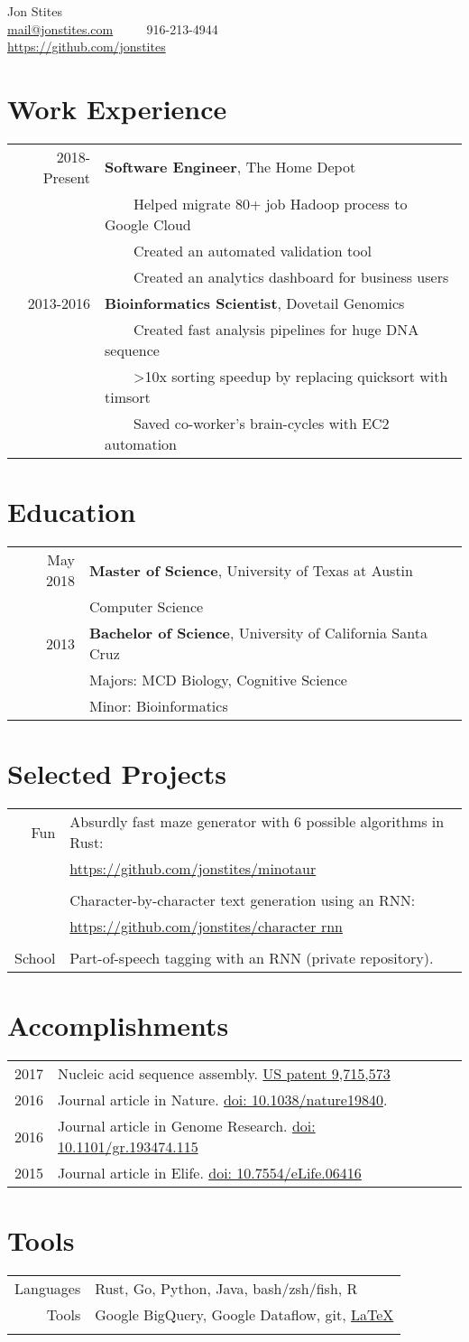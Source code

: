 \documentclass[12pt]{extarticle}
\makeatletter
\newcommand{\tabitem}{~~\llap{\textbullet}~~}
\newcommand*{\email}{
	\href{mailto:mail+resume@jonstites.com }{mail@jonstites.com}
	}
\newcommand*{\phone}{
	916-213-4944
	}
\newcommand*{\github}{
	{\href{https://github.com/jonstites}{https://github.com/jonstites}}
}
\newcommand*{\charrnn}{
	Character-by-character text generation using an RNN: \\
	& {\href{https://github.com/jonstites/character_rnn}{https://github.com/jonstites/character \textunderscore rnn}}
}
\newcommand*{\minotaur}{
	Absurdly fast maze generator with 6 possible algorithms in Rust: \\
	& {\href{https://github.com/jonstites/minotaur}{https://github.com/jonstites/minotaur}}
}
\newcommand*{\postagging}{
	Part-of-speech tagging with an RNN (private repository).
}
\newcommand*{\Contact}{
	\begin{center}
		\Huge Jon Stites \\
	    \small \email \tabitem \phone \\
	    \github \\
	\end{center}
}
\newcommand*{\Education}{
	\section{Education}
	\begin{tabular}{rl}
		May 2018  & \textbf{Master of Science}, University of Texas at Austin \\
				  & Computer Science \\
		2013 	  & \textbf{Bachelor of Science}, University of California Santa Cruz \\
				  & Majors: MCD Biology, Cognitive Science \\
		  		  & Minor: Bioinformatics \\
\end{tabular}
}
\newcommand*{\Projects}{
	\section{Selected Projects}
	\begin{tabular}{rl}
	Fun & \minotaur \\ \\
	    & \charrnn \\ \\
	School & \postagging \\
	\end{tabular}
}
\newcommand*{\Tools}{
	\section{Tools}
	\begin{tabular}{rl}
	Languages   & Rust, Go, Python, Java, bash/zsh/fish, R \\
	Tools & Google BigQuery, Google Dataflow, git, 
			  \href{http://stevehanov.ca/blog/resume_comic.png}{\LaTeX} \\ \\
	\end{tabular}
}
\newcommand*{\Work}{
	\section{Work Experience}
	\begin{tabular}{rl}
	2018-Present & \textbf{Software Engineer}, The Home Depot \\
	   & \tabitem Helped migrate 80+ job Hadoop process to Google Cloud \\
	   & \tabitem Created an automated validation tool  \\
	   & \tabitem Created an analytics dashboard for business users \\
	2013-2016 & \textbf{Bioinformatics Scientist}, 
			    Dovetail Genomics \\
	   & \tabitem Created fast analysis pipelines for huge DNA sequence \\
	   & \tabitem >10x sorting speedup by replacing quicksort with timsort \\
	   & \tabitem Saved co-worker's brain-cycles with EC2 automation \\

	\end{tabular}
}
\newcommand*{\Accomplishments}{
	\section{Accomplishments}
	\begin{tabular}{rl}
	2017 & Nucleic acid sequence assembly.
	\href{https://patents.google.com/patent/US9715573B2}
	{US patent 9,715,573} \\
	2016 & 
	Journal article in Nature.
	\href{https://www.ncbi.nlm.nih.gov/pubmed/27762356}
	{doi: 10.1038/nature19840}. \\
	2016 & 
	Journal article in Genome Research.
	\href{https://www.ncbi.nlm.nih.gov/pubmed/26848124}
	{doi: 10.1101/gr.193474.115} \\
	2015 & 
	Journal article in Elife.
	\href{https://www.ncbi.nlm.nih.gov/pubmed/25919952}
	{doi: 10.7554/eLife.06416}
	\end{tabular}
}
\makeatother
\begin{document}
\Contact
\Work
\Education
\Projects
\Accomplishments
\Tools
\end{document}
